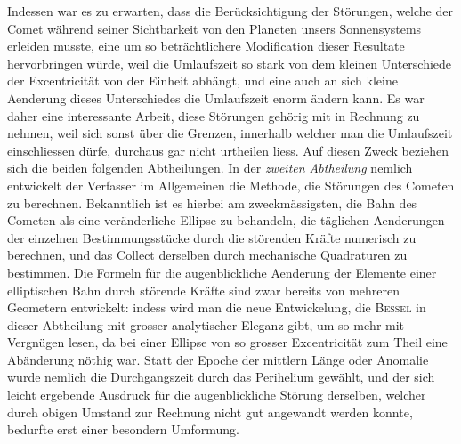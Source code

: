 Indessen war es zu erwarten, dass die Berücksichtigung der Störungen, welche der Comet während seiner Sichtbarkeit von den Planeten unsers Sonnensystems erleiden musste, eine um so beträchtlichere Modification dieser Resultate hervorbringen würde, weil die Umlaufszeit so stark von dem kleinen Unterschiede der Excentricität von der Einheit abhängt, und eine auch an sich kleine Aenderung dieses Unterschiedes die Umlaufszeit enorm ändern kann. Es war daher eine interessante Arbeit, diese Störungen gehörig mit in Rechnung zu nehmen, weil sich sonst über die Grenzen, innerhalb welcher man die Umlaufszeit einschliessen dürfe, durchaus gar nicht urtheilen liess. Auf diesen Zweck beziehen sich die beiden folgenden Abtheilungen. In der \emph{zweiten Abtheilung} nemlich entwickelt der Verfasser im Allgemeinen die Methode, die Störungen des Cometen zu berechnen. Bekanntlich ist es hierbei am zweckmässigsten, die Bahn des Cometen als eine veränderliche Ellipse zu behandeln, die täglichen Aenderungen der einzelnen Bestimmungsstücke durch die störenden Kräfte numerisch zu berechnen, und das Collect derselben durch mechanische Quadraturen zu bestimmen. Die Formeln für die augenblickliche Aenderung der Elemente einer elliptischen Bahn durch störende Kräfte sind zwar bereits von mehreren Geometern entwickelt: indess wird man die neue Entwickelung, die \textsc{Bessel} in dieser Abtheilung mit grosser analytischer Eleganz gibt, um so mehr mit Vergnügen lesen, da bei einer Ellipse von so grosser Excentricität zum Theil eine Abänderung nöthig war. Statt der Epoche der mittlern Länge oder Anomalie wurde nemlich die Durchgangszeit durch das Perihelium gewählt, und der sich leicht ergebende Ausdruck für die augenblickliche Störung derselben, welcher durch obigen Umstand zur Rechnung nicht gut angewandt werden konnte, bedurfte erst einer besondern Umformung.


